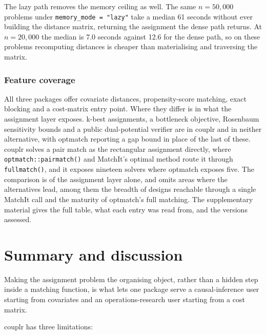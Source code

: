 The lazy path removes the memory ceiling as well. The same \(n = 50{,}000\)
problems under \texttt{memory\_mode\ =\ "lazy"} take a median
61 seconds without ever
building the distance matrix, returning the assignment the dense path returns.
At \(n = 20{,}000\) the median is
7.0 seconds against
12.6
for the dense path, so on these problems recomputing distances is cheaper than
materialising and traversing the matrix.

\FloatBarrier

\subsubsection{Feature coverage}\label{feature-coverage}

All three packages offer covariate distances, propensity-score matching, exact
blocking and a cost-matrix entry point. Where they differ is in what the
assignment layer exposes. k-best assignments, a bottleneck objective, Rosenbaum
sensitivity bounds and a public dual-potential verifier are in couplr and in
neither alternative, with optmatch reporting a gap bound in place of the last of
these. couplr solves a pair match as the rectangular assignment directly, where
\texttt{optmatch::pairmatch()} and MatchIt's optimal method route it through
\texttt{fullmatch()}, and it exposes nineteen solvers where optmatch exposes five. The
comparison is of the assignment layer alone, and omits areas where the
alternatives lead, among them the breadth of designs reachable through a single
MatchIt call and the maturity of optmatch's full matching. The supplementary
material gives the full table, what each entry was read from, and the versions
assessed.

\section{Summary and discussion}\label{summary-and-discussion}

Making the assignment problem the organising object, rather than a hidden step
inside a matching function, is what lets one package serve a causal-inference
user starting from covariates and an operations-research user starting from a
cost matrix.

couplr has three limitations:

